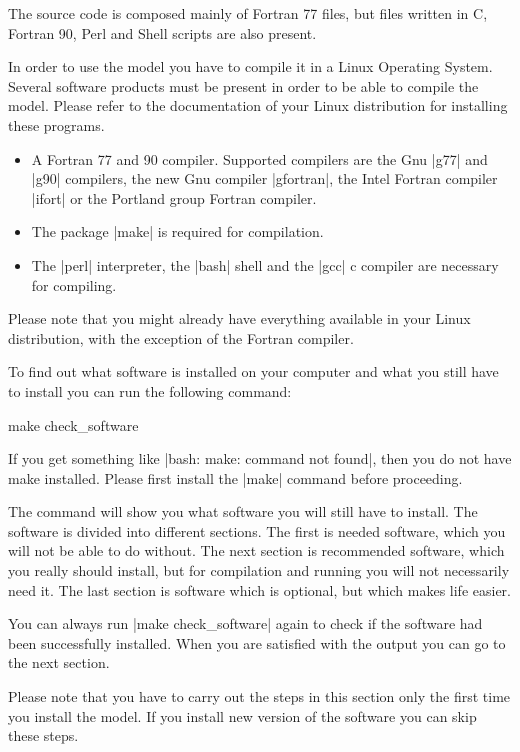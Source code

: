 
The source code is composed mainly of Fortran 77 files, but files written
in C, Fortran 90, Perl and Shell scripts are also present.

In order to use the model you have to compile it in a Linux Operating
System. Several software products must be present in order to be able
to compile the model. Please refer to the documentation of your Linux
distribution for installing these programs.

\begin{itemize}

\item A Fortran 77 and 90 compiler. Supported compilers are
the Gnu |g77| and |g90| compilers, the new Gnu compiler |gfortran|,
the Intel Fortran compiler |ifort| or the Portland group Fortran compiler.

\item The package |make| is required for compilation.

\item The |perl| interpreter, the |bash| shell and the |gcc| c compiler
are necessary for compiling.

\end{itemize}

Please note that you might already have everything available in your
Linux distribution, with the exception of the Fortran compiler.

To find out what software is installed on your computer and what you
still have to install you can run the following command:

\begin{code}
    make check_software
\end{code}

If you get something like |bash: make: command not found|, then you
do not have make installed. Please first install the |make| command
before proceeding.

The command will show you what software you will still have to
install. The software is divided into different sections. The first
is needed software, which you will not be able to do without. The next
section is recommended software, which you really should install, but
for compilation and running you will not necessarily need it. The last
section is software which is optional, but which makes life easier.

You can always run |make check_software| again to check if the software
had been successfully installed. When you are satisfied with the output
you can go to the next section.

Please note that you have to carry out the steps in this section only
the first time you install the model. If you install new version of the
software you can skip these steps.




